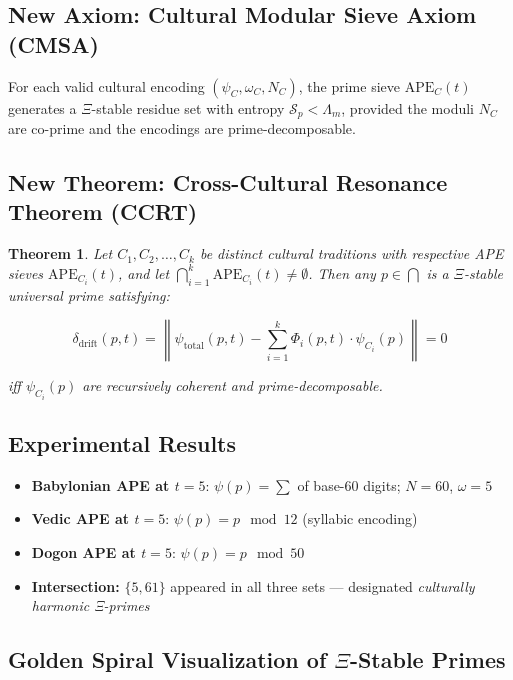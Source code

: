 \documentclass[12]{amsart}
\theoremstyle{plain}
\newtheorem{theorem}{Theorem}[section]
\begin{document}
\subsection{New Axiom: Cultural Modular Sieve Axiom (CMSA)}

\begin{axiom}[CMSA]
For each valid cultural encoding $(\psi_C, \omega_C, N_C)$, the prime sieve $\text{APE}_C(t)$ generates a $\Xi$-stable residue set with entropy $\mathcal{S}_p < \Lambda_m$, provided the moduli $N_C$ are co-prime and the encodings are prime-decomposable.
\end{axiom}

\subsection{New Theorem: Cross-Cultural Resonance Theorem (CCRT)}

\begin{theorem}
Let $C_1, C_2, \dots, C_k$ be distinct cultural traditions with respective APE sieves $\text{APE}_{C_i}(t)$, and let $\bigcap_{i=1}^k \text{APE}_{C_i}(t) \neq \emptyset$. Then any $p \in \bigcap$ is a $\Xi$-stable universal prime satisfying:

\[
\delta_{\text{drift}}(p, t) = \left\| \psi_{\text{total}}(p, t) - \sum_{i=1}^k \Phi_i(p, t) \cdot \psi_{C_i}(p) \right\| = 0
\]

\textit{iff} $\psi_{C_i}(p)$ are recursively coherent and prime-decomposable.
\end{theorem}

\subsection{Experimental Results}

\begin{itemize}
    \item \textbf{Babylonian APE at $t=5$}: $\psi(p) = \sum$ of base-60 digits; $N=60$, $\omega=5$
    \item \textbf{Vedic APE at $t=5$}: $\psi(p) = p \mod 12$ (syllabic encoding)
    \item \textbf{Dogon APE at $t=5$}: $\psi(p) = p \mod 50$
    \item \textbf{Intersection:} $\{5, 61\}$ appeared in all three sets — designated \textit{culturally harmonic Ξ-primes}
\end{itemize}

\subsection{Golden Spiral Visualization of $\Xi$-Stable Primes}
\end{document}
